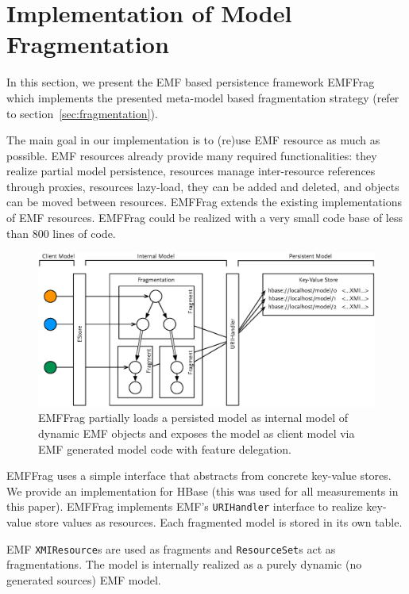 \section{Implementation of Model Fragmentation}
\label{sec:implemention}

In this section, we present the EMF based persistence framework EMFFrag~\cite{EMFFragProject} which implements the presented meta-model based fragmentation strategy (refer to section~\ref{sec:fragmentation}).

The main goal in our implementation is to (re)use EMF resource as much as possible. EMF resources already provide many required functionalities: they realize partial model persistence, resources manage inter-resource references through proxies, resources lazy-load, they can be added and deleted, and objects can be moved between resources. EMFFrag extends the existing implementations of EMF resources. EMFFrag could be realized with a very small code base of less than 800 lines of code.

\begin{figure}[t]
  \centering
  \includegraphics[width=0.75\linewidth]{figures/simpleArchitecture}
  \caption{EMFFrag partially loads a persisted model as internal model of dynamic EMF objects and exposes the model as client model via EMF generated model code with feature delegation.}
  \label{fig:architecture}
\end{figure}

EMFFrag uses a simple interface that abstracts from concrete key-value stores. We provide an implementation for HBase (this was used for all measurements in this paper). EMFFrag implements EMF's \texttt{URIHandler} interface to realize key-value store values as resources. Each fragmented model is stored in its own table.

 EMF \texttt{XMIResource}s are used as fragments and \texttt{ResourceSet}s act as fragmentations. The model is internally realized as a purely dynamic (no generated sources) EMF model.

